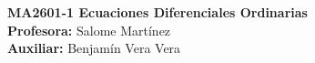 \noindent \textbf{MA2601-1 Ecuaciones Diferenciales Ordinarias}\\
\textbf{Profesora:} Salome Martínez\\
\textbf{Auxiliar:} Benjamín Vera Vera
